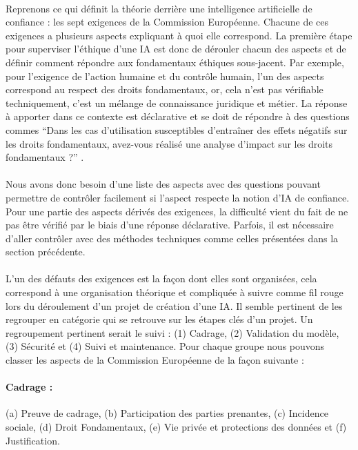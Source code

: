 \documentclass[10pt, french, a4paper]{report}
\begin{document}
\paragraph{}
Reprenons ce qui définit la théorie derrière une intelligence artificielle de confiance : les sept exigences de la Commission Européenne. Chacune de ces exigences a plusieurs aspects expliquant à quoi elle correspond. La première étape pour superviser l'éthique d'une IA est donc de dérouler chacun des aspects et de définir comment répondre aux fondamentaux éthiques sous-jacent. Par exemple, pour l'exigence de l'action humaine et du contrôle humain, l'un des aspects correspond au respect des droits fondamentaux, or, cela n'est pas vérifiable techniquement, c'est un mélange de connaissance juridique et métier. La réponse à apporter dans ce contexte est déclarative et se doit de répondre à des questions commes  ``Dans les cas d’utilisation susceptibles d’entraîner des effets négatifs sur les droits fondamentaux, avez-vous réalisé une analyse d’impact sur les droits fondamentaux ?'' \citep{commission_europeenne_ethics_2019}.

\paragraph{}
Nous avons donc besoin d'une liste des aspects avec des questions pouvant permettre de contrôler facilement si l'aspect respecte la notion d'IA de confiance. Pour une partie des aspects dérivés des exigences, la difficulté vient du fait de ne pas être vérifié par le biais d'une réponse déclarative. Parfois, il est nécessaire d'aller contrôler avec des méthodes techniques comme celles présentées dans la section précédente.

\paragraph{}
L'un des défauts des exigences est la façon dont elles sont organisées, cela correspond à une organisation théorique et compliquée à suivre comme fil rouge lors du déroulement d'un projet de création d'une IA. Il semble pertinent de les regrouper en catégorie qui se retrouve sur les étapes clés d'un projet. Un regroupement pertinent serait le suivi : (1) Cadrage, (2) Validation du modèle, (3) Sécurité et (4) Suivi et maintenance. Pour chaque groupe nous pouvons classer les aspects de la Commission Européenne de la façon suivante :

\paragraph{Cadrage :} (a) Preuve de cadrage, (b) Participation des parties prenantes, (c) Incidence sociale, (d) Droit Fondamentaux, (e) Vie privée et protections des données et (f) Justification.
\end{document}
